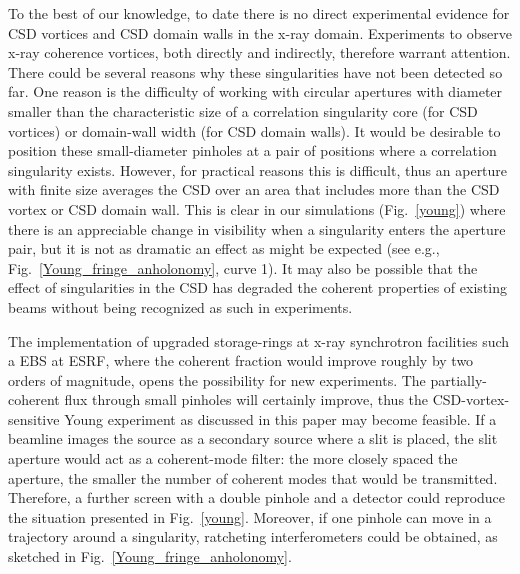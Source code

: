 \documentclass[%
 reprint,
 amsmath,amssymb,
 aps,
]{revtex4-1}
\begin{document}
To the best of our knowledge, to date there is no direct experimental evidence for CSD vortices and CSD domain walls in the x-ray domain.  Experiments to observe x-ray coherence vortices, both directly and indirectly, therefore warrant  attention. There could be several reasons why these singularities have not been detected so far. One reason is the difficulty of working with circular apertures with diameter smaller than the characteristic size of a correlation singularity core (for CSD vortices) or domain-wall width (for CSD domain walls). It would be desirable to position these small-diameter pinholes at a pair of positions where a correlation singularity exists. However, for practical reasons this is difficult, thus an aperture with finite size averages the CSD over an area that includes more than the CSD vortex or CSD domain wall. This is clear in our simulations ({Fig.~\ref{young}}) where there is an appreciable change in visibility when a singularity enters the aperture pair, but it is not as dramatic an effect as might be expected (see e.g., {Fig.~\ref{Young_fringe_anholonomy}}, curve 1). It may also be possible that the effect of singularities in the CSD has degraded the coherent properties of existing beams without being recognized as such in experiments. 

The implementation of upgraded storage-rings at x-ray synchrotron facilities such a EBS at ESRF, where the coherent fraction would improve roughly by two orders of magnitude, opens the possibility for new experiments. The partially-coherent flux through small pinholes will certainly improve, thus the CSD-vortex-sensitive Young experiment as discussed in this paper may become feasible. If a beamline images the source as a secondary source where a slit is placed, the slit aperture would act as a coherent-mode filter: the more closely spaced the aperture, the smaller the number of coherent modes that would be transmitted. Therefore, a further screen with a double pinhole and a detector could reproduce the situation presented in {Fig.~\ref{young}}. Moreover, if one pinhole can move in a trajectory around a singularity, ratcheting interferometers could be obtained, as sketched in Fig.~\ref{Young_fringe_anholonomy}. 
\end{document}
